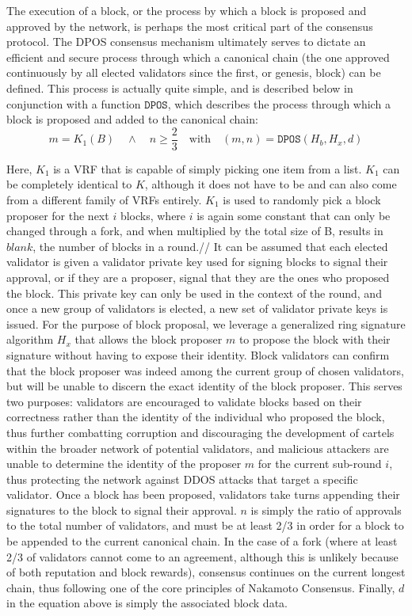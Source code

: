 \documentclass[conference]{IEEEtran}
\begin{document}
The execution of a block, or the process by which a block is proposed and approved by the network, is perhaps the most critical part of the consensus protocol. The DPOS consensus mechanism ultimately serves to dictate an efficient and secure process through which a canonical chain (the one approved continuously by all elected validators since the first, or genesis, block) can be defined. This process is actually quite simple, and is described below in conjunction with a function $\mathtt{DPOS}$, which describes the process through which a block is proposed and added to the canonical chain:
\begin{equation}
    m = {K_1(B)} \quad \wedge \quad n \ge \frac{2}{3} \quad
\text{with} \quad (m,n) = \mathtt{DPOS}(H_b,H_x,d) \end{equation}

Here, $K_1$ is a VRF that is capable of simply picking one item from a list. $K_1$ can be completely identical to $K$, although it does not have to be and can also come from a different family of VRFs entirely. $K_1$ is used to randomly pick a block proposer for the next $i$ blocks, where $i$ is again some constant that can only be changed through a fork, and when multiplied by the total size of B, results in $blank$, the number of blocks in a round.//
It can be assumed that each elected validator is given a validator private key used for signing blocks to signal their approval, or if they are a proposer, signal that they are the ones who proposed the block. This private key can only be used in the context of the round, and once a new group of validators is elected, a new set of validator private keys is issued. For the purpose of block proposal, we leverage a generalized ring signature algorithm $H_x$ that allows the block proposer $m$ to propose the block with their signature without having to expose their identity. Block validators can confirm that the block proposer was indeed among the current group of chosen validators, but will be unable to discern the exact identity of the block proposer. This serves two purposes: validators are encouraged to validate blocks based on their correctness rather than the identity of the individual who proposed the block, thus further combatting corruption and discouraging the development of cartels within the broader network of potential validators, and malicious attackers are unable to determine the identity of the proposer $m$ for the current sub-round $i$, thus protecting the network against DDOS attacks that target a specific validator. 
Once a block has been proposed, validators take turns appending their signatures to the block to signal their approval. $n$ is simply the ratio of approvals to the total number of validators, and must be at least 2/3 in order for a block to be appended to the current canonical chain. In the case of a fork (where at least 2/3 of validators cannot come to an agreement, although this is unlikely because of both reputation and block rewards), consensus continues on the current longest chain, thus following one of the core principles of Nakamoto Consensus.  Finally, $d$ in the equation above is simply the associated block data.
\end{document}
